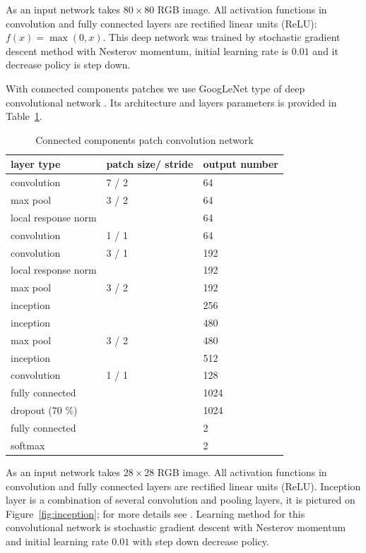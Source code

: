 \documentclass[conference,a4paper]{ieeetran}
\begin{document}
As an input network takes $80\times80$ RGB image. All activation functions in convolution and fully connected layers are rectified linear units (ReLU): $f(x)=\max(0, x)$. This deep network was trained by stochastic gradient descent method with Nesterov momentum, initial learning rate is $0.01$ and it decrease policy is step down. 

With connected components patches we use GoogLeNet type of deep convolutional network \cite{Googlenet}. Its architecture and layers parameters is provided in Table~\ref{googlenet_tab}.
\begin{table}[!t]
\centering
\caption{Connected components patch convolution network}
\label{googlenet_tab}
\begin{tabular}{|l|p{1.3cm}|p{1.3cm}|}
\hline
\textbf{layer type} & \textbf{patch size/ stride} & \textbf{output number}  \\
\hline
convolution & 7 / 2 & 64 \\
\hline
max pool & 3 / 2 & 64 \\
\hline
local response norm & & 64 \\
\hline
convolution & 1 / 1 & 64 \\
\hline
convolution & 3 / 1 & 192 \\
\hline
local response norm & & 192 \\
\hline
max pool & 3 / 2 & 192 \\
\hline
inception &  & 256 \\
\hline
inception &  & 480 \\
\hline
max pool & 3 / 2 & 480 \\
\hline
inception &  & 512 \\
\hline
convolution & 1 / 1 & 128 \\
\hline
fully connected & & 1024 \\
\hline
dropout (70 \%) & & 1024 \\
\hline
fully connected & & 2 \\
\hline
softmax & & 2 \\
\hline
\end{tabular}
\end{table}		

As an input network takes $28\times28$ RGB image. All activation functions in convolution and fully connected layers are rectified linear units (ReLU). Inception layer is a combination of several convolution and pooling layers, it is pictured on Figure~\ref{fig:inception}; for more details see \cite{Googlenet}. Learning method for this convolutional network is stochastic gradient descent with Nesterov momentum and initial learning rate $0.01$ with step down decrease policy.
\end{document}
